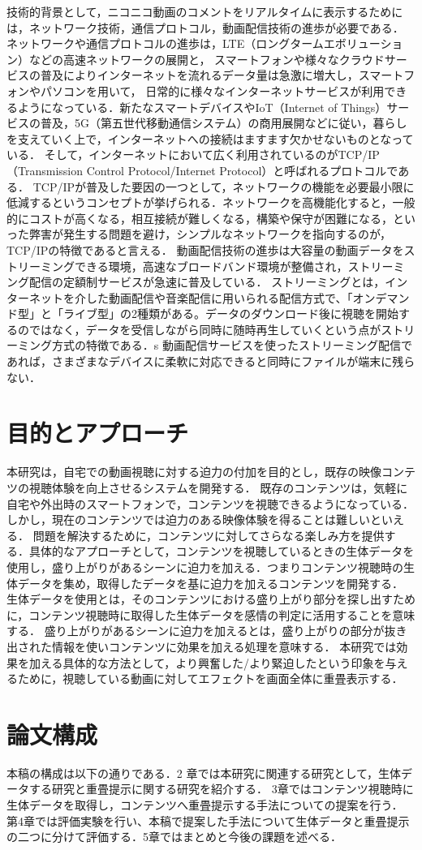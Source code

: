 技術的背景として，ニコニコ動画のコメントをリアルタイムに表示するためには，ネットワーク技術，通信プロトコル，動画配信技術の進歩が必要である．
ネットワークや通信プロトコルの進歩は，LTE（ロングタームエボリューション）などの高速ネットワークの展開と， スマートフォンや様々なクラウドサービスの普及によりインターネットを流れるデータ量は急激に増大し，スマートフォンやパソコンを用いて，
日常的に様々なインターネットサービスが利用できるようになっている．新たなスマートデバイスやIoT（Internet of Things）サービスの普及，5G（第五世代移動通信システム）の商用展開などに従い，暮らしを支えていく上で，インターネットへの接続はますます欠かせないものとなっている．
そして，インターネットにおいて広く利用されているのがTCP/IP（Transmission Control Protocol/Internet Protocol）と呼ばれるプロトコルである．
TCP/IPが普及した要因の一つとして，ネットワークの機能を必要最小限に低減するというコンセプトが挙げられる．ネットワークを高機能化すると，一般的にコストが高くなる，相互接続が難しくなる，構築や保守が困難になる，といった弊害が発生する問題を避け，シンプルなネットワークを指向するのが，TCP/IPの特徴であると言える．
動画配信技術の進歩は大容量の動画データをストリーミングできる環境，高速なブロードバンド環境が整備され，ストリーミング配信の定額制サービスが急速に普及している．
ストリーミングとは，インターネットを介した動画配信や音楽配信に用いられる配信方式で、「オンデマンド型」と「ライブ型」の2種類がある。データのダウンロード後に視聴を開始するのではなく，データを受信しながら同時に随時再生していくという点がストリーミング方式の特徴である．s
動画配信サービスを使ったストリーミング配信であれば，さまざまなデバイスに柔軟に対応できると同時にファイルが端末に残らない．

\section{目的とアプローチ}
本研究は，自宅での動画視聴に対する迫力の付加を目的とし，既存の映像コンテツの視聴体験を向上させるシステムを開発する．
既存のコンテンツは，気軽に自宅や外出時のスマートフォンで，コンテンツを視聴できるようになっている．しかし，現在のコンテンツでは迫力のある映像体験を得ることは難しいといえる．
問題を解決するために，コンテンツに対してさらなる楽しみ方を提供する．具体的なアプローチとして，コンテンツを視聴しているときの生体データを使用し，盛り上がりがあるシーンに迫力を加える．つまりコンテンツ視聴時の生体データを集め，取得したデータを基に迫力を加えるコンテンツを開発する．
生体データを使用とは，そのコンテンツにおける盛り上がり部分を探し出すために，コンテンツ視聴時に取得した生体データを感情の判定に活用することを意味する．
盛り上がりがあるシーンに迫力を加えるとは，盛り上がりの部分が抜き出された情報を使いコンテンツに効果を加える処理を意味する．
本研究では効果を加える具体的な方法として，より興奮した/より緊迫したという印象を与えるために，視聴している動画に対してエフェクトを画面全体に重畳表示する．

\section{論文構成}
本稿の構成は以下の通りである．2 章では本研究に関連する研究として，生体データする研究と重畳提示に関する研究を紹介する．
3章ではコンテンツ視聴時に生体データを取得し，コンテンツへ重畳提示する手法についての提案を行う．
第4章では評価実験を行い、本稿で提案した手法について生体データと重畳提示の二つに分けて評価する．5章ではまとめと今後の課題を述べる．

